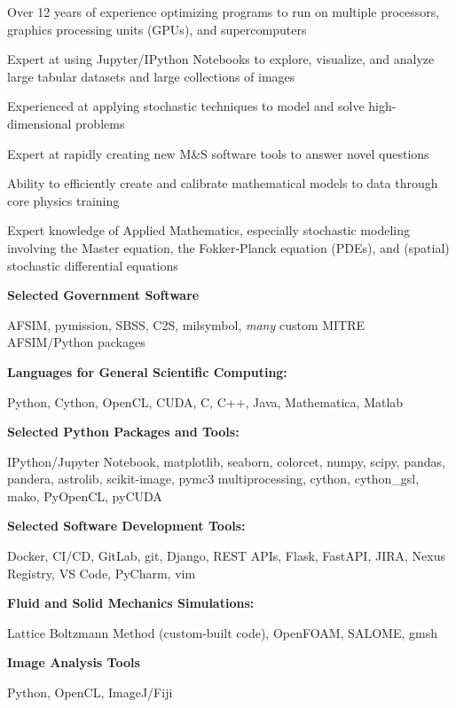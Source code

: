 \documentclass[letterpaper,11pt]{article}
\newcommand{\resitem}[1]{\item #1 \vspace{-2pt}}
\newcommand{\skillitem}[1]{ \item{#1}  \vspace{-3pt}}
\newcommand{\skillheader}[1]{ \item \textbf{#1}  \vspace{-7pt}}
\begin{document}
\begin{myitemize}

\skillitem{Over 12 years of experience optimizing programs to run on multiple processors, graphics processing units (GPUs), and supercomputers}

\skillitem{Expert at using Jupyter/IPython Notebooks to explore, visualize, and analyze large tabular datasets and large collections of images}

\skillitem{Experienced at applying stochastic techniques to model and solve high-dimensional problems}

\skillitem{Expert at rapidly creating new M\&S software tools to answer novel questions}

\skillitem{Ability to efficiently create and calibrate mathematical models to data through core physics training}
\skillitem{Expert knowledge of Applied Mathematics, especially stochastic modeling involving the Master equation, the Fokker-Planck equation (PDEs), and (spatial) stochastic differential equations}

\skillheader{Selected Government Software}
\begin{myitemize}
\skillitem{AFSIM, pymission, SBSS, C2S, milsymbol, \textit{many} custom MITRE AFSIM/Python packages}
\end{myitemize}

\skillheader{Languages for General Scientific Computing:}
\begin{myitemize}
\skillitem{Python, Cython, OpenCL, CUDA, C, C++, Java, Mathematica, Matlab}
\end{myitemize}

\skillheader{Selected Python Packages and Tools:}
\begin{myitemize}
\skillitem{IPython/Jupyter Notebook, matplotlib, seaborn, colorcet, numpy, scipy, pandas, pandera, astrolib, scikit-image, pymc3 multiprocessing, cython, cython\_gsl, mako, PyOpenCL, pyCUDA}
\end{myitemize}

\skillheader{Selected Software Development Tools:}
\begin{myitemize}
\skillitem{Docker, CI/CD, GitLab, git, Django, REST APIs, Flask, FastAPI, JIRA, Nexus Registry, VS Code, PyCharm, vim}
\end{myitemize}

\skillheader{Fluid and Solid Mechanics Simulations:}
\begin{myitemize}
\skillitem{Lattice Boltzmann Method (custom-built code), OpenFOAM, SALOME, gmsh}
\end{myitemize}        

\skillheader{Image Analysis Tools}
\begin{myitemize}
\resitem{Python, OpenCL, ImageJ/Fiji}
\end{myitemize}
             
\end{myitemize}
\end{document}
